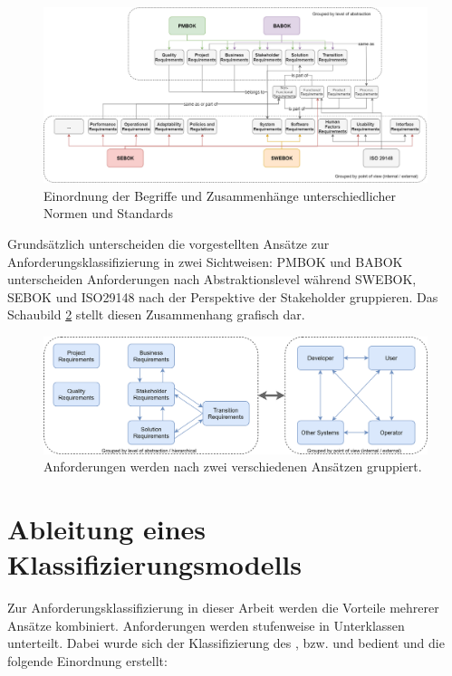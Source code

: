 \begin{figure}[htbp]
 \centering
 \includegraphics[width=1.0\textwidth]{gfx/Requirements.png}
 \caption{Einordnung der Begriffe und Zusammenhänge unterschiedlicher Normen und Standards}
 \label{fig:chapter05:requirements}
\end{figure}

Grundsätzlich unterscheiden die vorgestellten Ansätze zur Anforderungsklassifizierung in zwei Sichtweisen: \ac{PMBOK} und \ac{BABOK} unterscheiden Anforderungen nach Abstraktionslevel während \ac{SWEBOK}, \ac{SEBOK} und ISO29148 nach der Perspektive der Stakeholder gruppieren. Das Schaubild \ref{fig:chapter05:requirements_grouping} stellt diesen Zusammenhang grafisch dar.

\begin{figure}[htbp]
 \centering
 \includegraphics[width=1.0\textwidth]{gfx/Requirements_Grouping.png}
 \caption{Anforderungen werden nach zwei verschiedenen Ansätzen gruppiert.}
 \label{fig:chapter05:requirements_grouping}
\end{figure}

\section{Ableitung eines Klassifizierungsmodells}
\label{sec:requirements:model}

Zur Anforderungsklassifizierung in dieser Arbeit werden die Vorteile mehrerer Ansätze kombiniert. Anforderungen werden stufenweise in Unterklassen unterteilt. Dabei wurde sich der Klassifizierung des \cite{SWEBOK}, \cite{PMBOK} bzw. \cite{BABOK} und \cite{ISO25010} bedient und die folgende Einordnung erstellt:

